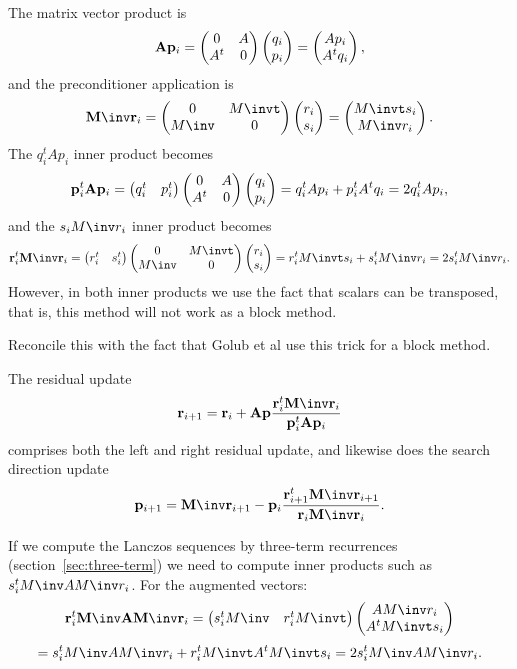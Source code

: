 \documentclass[11pt]{artikel3}
\begin{document}
\begin{Outline}
The matrix vector product is
\[ {\mathbf A}{\mathbf p}_i=\begin{pmatrix}0&A\cr A^t&0\end{pmatrix}\begin{pmatrix}q_i\cr p_i\end{pmatrix}=\begin{pmatrix}Ap_i\cr
A^tq_i\end{pmatrix},\]
and the preconditioner application is
\[ \Mb\rb_i=\begin{pmatrix}0&M\invt\cr M\inv&0\end{pmatrix}\begin{pmatrix}r_i\cr s_i\end{pmatrix}=\begin{pmatrix}M\invt
s_i\cr M\inv r_i\end{pmatrix}. \]
The $q_i^tAp_i$ inner product becomes
\[ {\mathbf p}_i^t{\mathbf A}{\mathbf p}_i=
\begin{pmatrix}q_i^t&p_i^t\end{pmatrix}\begin{pmatrix}0&A\cr A^t&0\end{pmatrix}\begin{pmatrix}q_i\cr p_i\end{pmatrix} =
q_i^tAp_i + p_i^tA^tq_i = 2q_i^tAp_i, \]
and the $s_iM\inv r_i$ inner product becomes
\[ \rb_i^t\Mb\rb_i=
\begin{pmatrix}r_i^t&s_i^t\end{pmatrix}\begin{pmatrix}0&M\invt\cr M\inv&0\end{pmatrix}\begin{pmatrix}r_i\cr
s_i\end{pmatrix} = r_i^tM\invt s_i+s_i^tM\inv r_i=2s_i^tM\inv r_i. \]
However, in both inner products we use the fact that scalars can be
transposed, that is, this method will not work as a block method.
\begin{question}Reconcile this with the fact that Golub et al use this
trick for a block method.\end{question}

The residual update
\[ \rb_{i+1}=\rb_i+\Ab\pb{\rb_i^t\Mb\rb_i\over \pb_i^t\Ab\pb_i} \]
comprises both the left and right residual update, and likewise does
the search direction update
\[ \pb_{i+1}=\Mb\rb_{i+1}-\pb_i{\rb_{i+1}^t\Mb\rb_{i+1}\over
\rb_i\Mb\rb_i}. \]

If we compute the Lanczos sequences by three-term recurrences
(section~\ref{sec:three-term}) we need to compute inner products
such as $s_i^tM\inv AM\inv r_i$.
For the augmented vectors:
\[ \rb_i^t\Mb\Ab\Mb\rb_i=
\begin{pmatrix}s_i^tM\inv&r_i^tM\invt\end{pmatrix}\begin{pmatrix}AM\inv r_i\cr A^tM\invt
s_i\end{pmatrix}\]
\[ =s_i^tM\inv AM\inv r_i+r_i^tM\invt A^tM\invt s_i=2s_i^tM\inv AM\inv
r_i. \]


\end{Outline}
\end{document}
